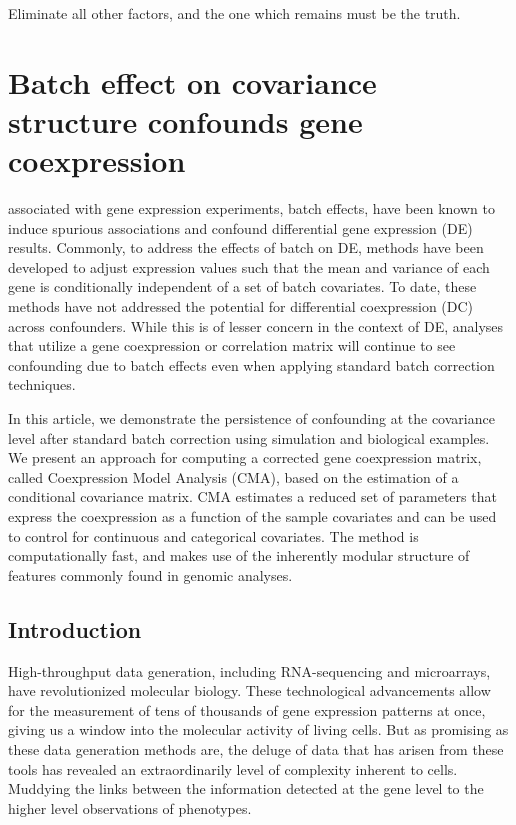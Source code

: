 \begin{savequote}[75mm]
Eliminate all other factors, and the one which remains must be the truth.
\end{savequote}

\chapter{Batch effect on covariance structure confounds gene coexpression}

 associated with gene expression experiments, batch effects, have been known to induce spurious associations and  confound differential gene expression (DE) results. Commonly, to address the effects of batch on DE, methods have been developed to adjust expression values such that the mean and variance of each gene is conditionally independent of a set of batch covariates. To date, these methods have not addressed the potential for differential coexpression (DC) across confounders. While this is of lesser concern in the context of DE, analyses that utilize a gene coexpression or correlation matrix will continue to see confounding due to batch effects even when applying standard batch correction techniques. 

In this article, we demonstrate the persistence of confounding at the covariance level after standard batch correction using simulation and biological examples. We present an approach for computing a corrected gene coexpression matrix, called Coexpression Model Analysis (CMA), based on the estimation of a conditional covariance matrix. CMA estimates a reduced set of parameters that express the coexpression as a function of the sample covariates and can be used to control for continuous and categorical covariates. The method is computationally fast, and makes use of the inherently modular structure of features commonly found in genomic analyses.

\section{Introduction}

High-throughput data generation, including RNA-sequencing and microarrays,
have revolutionized molecular biology. These technological advancements
allow for the measurement of tens of thousands of gene expression
patterns at once, giving us a window into the molecular activity of
living cells. But as promising as these data generation methods are,
the deluge of data that has arisen from these tools has revealed an
extraordinarily level of complexity inherent to cells.  Muddying the links between the information detected at the gene level to the higher level observations of phenotypes.

